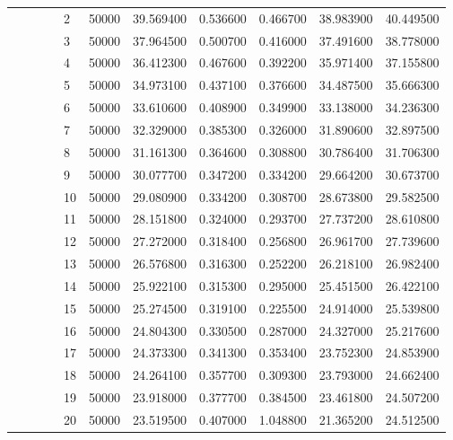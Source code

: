 \begin{tabular}{llllllrrrrr}
\cline{5-11}
 &  &  &  & 2 & 50000 & 39.569400 & 0.536600 & 0.466700 & 38.983900 & 40.449500 \\
\cline{5-11}
 &  &  &  & 3 & 50000 & 37.964500 & 0.500700 & 0.416000 & 37.491600 & 38.778000 \\
\cline{5-11}
 &  &  &  & 4 & 50000 & 36.412300 & 0.467600 & 0.392200 & 35.971400 & 37.155800 \\
\cline{5-11}
 &  &  &  & 5 & 50000 & 34.973100 & 0.437100 & 0.376600 & 34.487500 & 35.666300 \\
\cline{5-11}
 &  &  &  & 6 & 50000 & 33.610600 & 0.408900 & 0.349900 & 33.138000 & 34.236300 \\
\cline{5-11}
 &  &  &  & 7 & 50000 & 32.329000 & 0.385300 & 0.326000 & 31.890600 & 32.897500 \\
\cline{5-11}
 &  &  &  & 8 & 50000 & 31.161300 & 0.364600 & 0.308800 & 30.786400 & 31.706300 \\
\cline{5-11}
 &  &  &  & 9 & 50000 & 30.077700 & 0.347200 & 0.334200 & 29.664200 & 30.673700 \\
\cline{5-11}
 &  &  &  & 10 & 50000 & 29.080900 & 0.334200 & 0.308700 & 28.673800 & 29.582500 \\
\cline{5-11}
 &  &  &  & 11 & 50000 & 28.151800 & 0.324000 & 0.293700 & 27.737200 & 28.610800 \\
\cline{5-11}
 &  &  &  & 12 & 50000 & 27.272000 & 0.318400 & 0.256800 & 26.961700 & 27.739600 \\
\cline{5-11}
 &  &  &  & 13 & 50000 & 26.576800 & 0.316300 & 0.252200 & 26.218100 & 26.982400 \\
\cline{5-11}
 &  &  &  & 14 & 50000 & 25.922100 & 0.315300 & 0.295000 & 25.451500 & 26.422100 \\
\cline{5-11}
 &  &  &  & 15 & 50000 & 25.274500 & 0.319100 & 0.225500 & 24.914000 & 25.539800 \\
\cline{5-11}
 &  &  &  & 16 & 50000 & 24.804300 & 0.330500 & 0.287000 & 24.327000 & 25.217600 \\
\cline{5-11}
 &  &  &  & 17 & 50000 & 24.373300 & 0.341300 & 0.353400 & 23.752300 & 24.853900 \\
\cline{5-11}
 &  &  &  & 18 & 50000 & 24.264100 & 0.357700 & 0.309300 & 23.793000 & 24.662400 \\
\cline{5-11}
 &  &  &  & 19 & 50000 & 23.918000 & 0.377700 & 0.384500 & 23.461800 & 24.507200 \\
\cline{5-11}
 &  &  &  & 20 & 50000 & 23.519500 & 0.407000 & 1.048800 & 21.365200 & 24.512500 \\
\cline{5-11}

\end{tabular}
